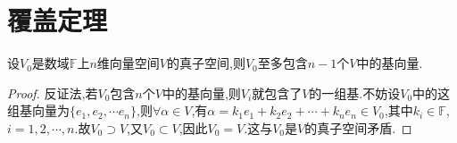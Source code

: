 \documentclass[../../main.tex]{subfiles}%
\begin{document}
\section{覆盖定理}

\begin{proposition}\label{proposition:真子空间至多包含n-1个基向量}
设\(V_0\)是数域\(\mathbb{F}\)上$n$维向量空间\(V\)的真子空间,则\(V_0\)至多包含$n-1$个$V$中的基向量.
\end{proposition}
\begin{proof}
反证法,若$V_0$包含\(n\)个\(V\)中的基向量,则$V_i$就包含了$V$的一组基.不妨设$V_0$中的这组基向量为$\{e_1,e_2,\cdots e_n\}$,则$\forall \alpha\in V$,有$\alpha =k_1e_1+k_2e_2+\cdots +k_ne_n \in V_0$,其中$k_i\in \mathbb{F}$,$i=1,2,\cdots,n$.故$V_0\supset V$,又$V_0\subset V$,因此$V_0=V$.这与\(V_0\)是\(V\)的真子空间矛盾.
\end{proof}
\end{document}
